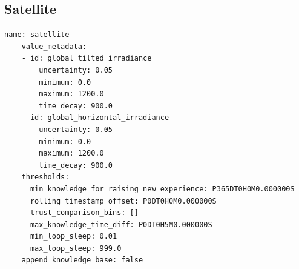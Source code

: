 \FloatBarrier
\subsection{Satellite}

\begin{lstlisting}[style=yaml]
    name: satellite
    value_metadata:
    - id: global_tilted_irradiance
        uncertainty: 0.05
        minimum: 0.0
        maximum: 1200.0
        time_decay: 900.0
    - id: global_horizontal_irradiance
        uncertainty: 0.05
        minimum: 0.0
        maximum: 1200.0
        time_decay: 900.0
    thresholds:
      min_knowledge_for_raising_new_experience: P365DT0H0M0.000000S
      rolling_timestamp_offset: P0DT0H0M0.000000S
      trust_comparison_bins: []
      max_knowledge_time_diff: P0DT0H5M0.000000S
      min_loop_sleep: 0.01
      max_loop_sleep: 999.0
    append_knowledge_base: false
\end{lstlisting}